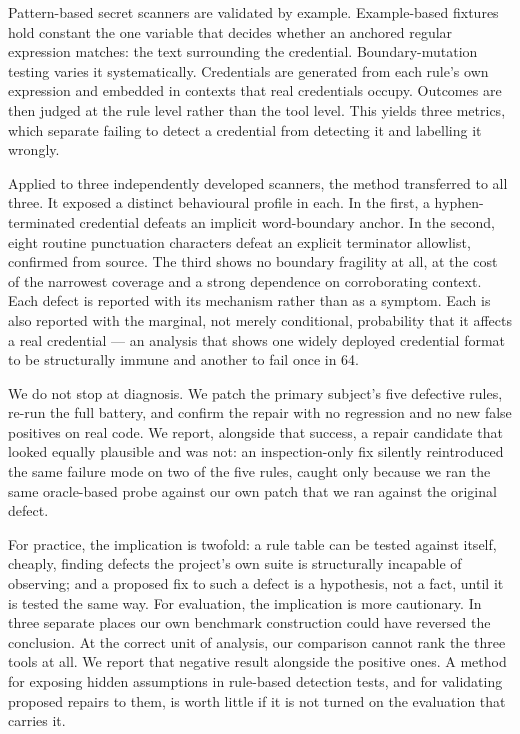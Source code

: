 \documentclass[journal]{IEEEtran}
\begin{document}
Pattern-based secret scanners are validated by example. Example-based fixtures hold constant the one variable that decides whether an anchored regular expression matches: the text surrounding the credential. Boundary-mutation testing varies it systematically. Credentials are generated from each rule's own expression and embedded in contexts that real credentials occupy. Outcomes are then judged at the rule level rather than the tool level. This yields three metrics, which separate failing to detect a credential from detecting it and labelling it wrongly.

Applied to three independently developed scanners, the method transferred to all three. It exposed a distinct behavioural profile in each. In the first, a hyphen-terminated credential defeats an implicit word-boundary anchor. In the second, eight routine punctuation characters defeat an explicit terminator allowlist, confirmed from source. The third shows no boundary fragility at all, at the cost of the narrowest coverage and a strong dependence on corroborating context. Each defect is reported with its mechanism rather than as a symptom. Each is also reported with the marginal, not merely conditional, probability that it affects a real credential --- an analysis that shows one widely deployed credential format to be structurally immune and another to fail once in 64.

We do not stop at diagnosis. We patch the primary subject's five defective rules, re-run the full battery, and confirm the repair with no regression and no new false positives on real code. We report, alongside that success, a repair candidate that looked equally plausible and was not: an inspection-only fix silently reintroduced the same failure mode on two of the five rules, caught only because we ran the same oracle-based probe against our own patch that we ran against the original defect.

For practice, the implication is twofold: a rule table can be tested against itself, cheaply, finding defects the project's own suite is structurally incapable of observing; and a proposed fix to such a defect is a hypothesis, not a fact, until it is tested the same way. For evaluation, the implication is more cautionary. In three separate places our own benchmark construction could have reversed the conclusion. At the correct unit of analysis, our comparison cannot rank the three tools at all. We report that negative result alongside the positive ones. A method for exposing hidden assumptions in rule-based detection tests, and for validating proposed repairs to them, is worth little if it is not turned on the evaluation that carries it.
\end{document}
